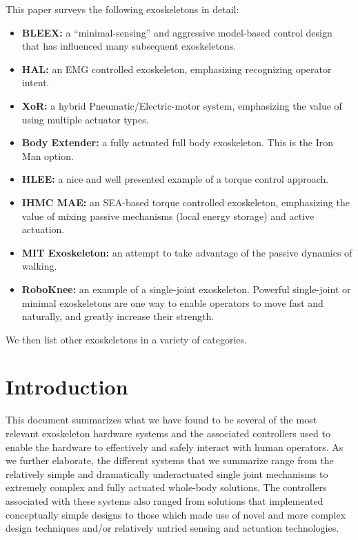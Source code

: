 \documentclass[letterpaper,12pt,fullpage]{article}
\begin{document}
This paper surveys the following exoskeletons in detail:
\begin{itemize}
\item
{\bf BLEEX:} a ``minimal-sensing'' and aggressive model-based control design that has influenced many subsequent exoskeletons.
\item
{\bf HAL:} an EMG controlled exoskeleton, emphasizing recognizing operator intent.
\item
{\bf XoR:} a hybrid Pneumatic/Electric-motor system, emphasizing the
value of using multiple actuator types.
\item
{\bf Body Extender:} a fully actuated full body exoskeleton. This is the
Iron Man option.
\item
{\bf HLEE:} a nice and well presented example of a torque control approach.
\item
{\bf IHMC MAE:} an SEA-based torque controlled exoskeleton, emphasizing
the value of mixing passive mechanisms (local energy storage) and active
actuation.
\item
{\bf MIT Exoskeleton:} an attempt to take advantage of the passive dynamics
of walking.
\item
{\bf RoboKnee:} an example of a single-joint exoskeleton. Powerful single-joint
or minimal exoskeletons are one way to enable operators to move fast
and naturally, and greatly increase their strength.
\end{itemize}

We then list other exoskeletons in a variety of categories.

\section{Introduction}

This document summarizes what we have found to be several of the most relevant exoskeleton hardware systems and the associated controllers used to enable the hardware to effectively and safely interact with human operators.  As we further elaborate, the different systems that we summarize range from the relatively simple and dramatically underactuated single joint mechanisms to extremely complex and fully actuated whole-body solutions.  The controllers associated with these systems also ranged from solutions that implemented conceptually simple designs to those which made use of novel and more complex design techniques and/or relatively untried sensing and actuation technologies. 
\end{document}
